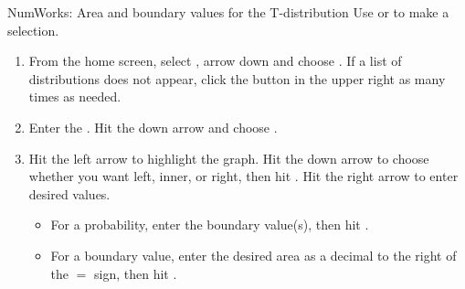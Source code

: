 \begin{onebox}{NumWorks: Area and boundary values for the T-distribution}
\label{normalnumworks}
Use  or  to make a selection.
\begin{enumerate}
\setlength{\itemsep}{0mm}
\item From the home screen, select , arrow down and choose .  If a list of distributions does not appear, click the \calcbutton{$\lhookleftarrow$} button in the upper right as many times as needed.
\item Enter the .  Hit the down arrow and choose . 
\item Hit the left arrow to highlight the graph.  Hit the down arrow to choose whether you want left, inner, or right, then hit .  Hit the right arrow to enter desired values.  
\begin{itemize}
\item[(i)] For a probability, enter the boundary value(s), then hit .  
\item[(ii)] For a boundary value, enter the desired area as a decimal to the right of the $=$ sign, then hit .
\end{itemize}
\begin{center}
\hspace{10mm}
\end{center}
\vspace{-1.5mm}
\end{enumerate}
\end{onebox}


